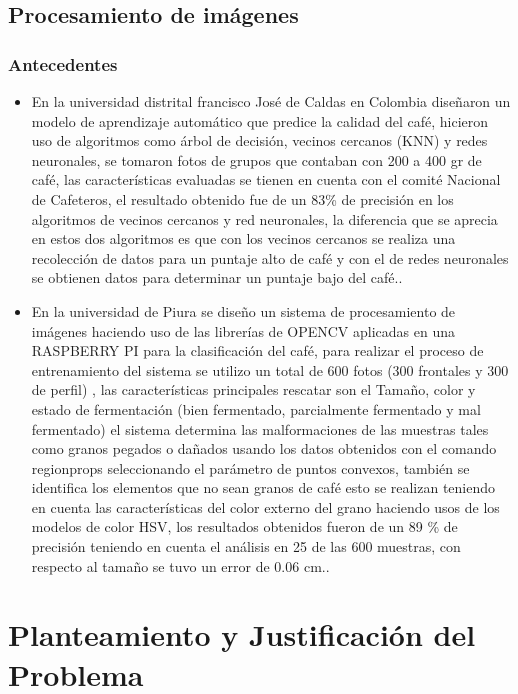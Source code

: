 \subsection{Procesamiento de imágenes}

\subsubsection{Antecedentes}
\begin{itemize}
    \item En la universidad distrital francisco José de Caldas en Colombia diseñaron un modelo de aprendizaje automático que predice la calidad del café, hicieron uso de algoritmos como árbol de decisión, vecinos cercanos (KNN) y redes neuronales, se tomaron fotos de grupos que contaban con 200 a 400 gr de café, las características evaluadas se tienen en cuenta con el comité Nacional de Cafeteros, el resultado obtenido fue de un 83\%  de precisión en los algoritmos de vecinos cercanos y red neuronales, la diferencia que se aprecia en estos dos algoritmos es que con los vecinos cercanos se realiza una recolección de datos para un puntaje alto de café y con el de redes neuronales se obtienen datos para determinar un puntaje bajo del café.\citep{suarez2019modelo}.

     \item 	En la universidad de Piura se diseño un sistema de procesamiento de imágenes haciendo uso de las librerías de OPENCV aplicadas en una RASPBERRY PI para la clasificación del café, para realizar el proceso de entrenamiento del sistema se utilizo un total de 600 fotos (300 frontales y 300 de perfil) , las características principales  rescatar son el Tamaño, color y estado de fermentación (bien fermentado, parcialmente fermentado y mal fermentado) el sistema determina las malformaciones de las muestras tales como granos pegados o dañados usando los datos obtenidos con el comando regionprops seleccionando el parámetro de puntos convexos, también se identifica los elementos que no sean granos de café esto se realizan teniendo en cuenta las características del color externo del grano haciendo usos de los modelos de color HSV,  los resultados obtenidos fueron de un 89 \% de precisión teniendo en cuenta el análisis en 25 de las 600 muestras, con respecto al tamaño se tuvo un error de 0.06 cm.\citep{viera2017procesamiento}.

\end{itemize}

\section{Planteamiento y Justificación del Problema}

